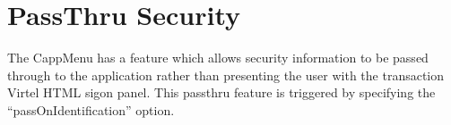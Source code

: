 \documentclass[letterpaper,10pt,english]{sphinxmanual}
\begin{document}
\section{PassThru Security}
\label{\detokenize{Customization:passthru-security}}
\sphinxAtStartPar
The CappMenu has a feature which allows security information to be passed through to the application rather than presenting the user with the transaction Virtel HTML sigon panel. This passthru feature is triggered by specifying the “passOnIdentification” option.

\begin{sphinxVerbatim}[commandchars=\\\{\}]
   
   
   
\end{sphinxVerbatim}

\newpage
\end{document}
